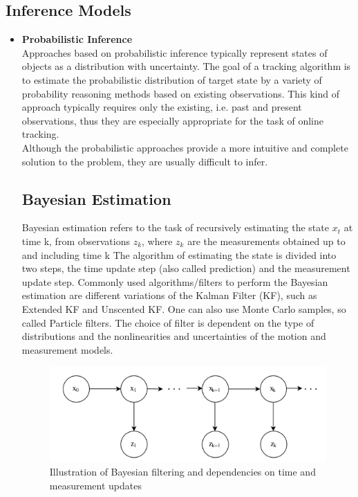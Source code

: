     \subsection{Inference Models}
        \begin{itemize}
            \item \textbf{Probabilistic Inference} \\ 
                Approaches based on probabilistic inference typically  represent states of objects as a distribution with uncertainty. The goal of a tracking algorithm is to estimate the probabilistic distribution of target state 
                by a variety of probability reasoning methods based on existing observations. This kind of approach typically requires only the existing, i.e. past and present observations, thus they are especially appropriate for 
                the task of online tracking. \\
                \vspace{3mm}
                Although the probabilistic approaches provide a more intuitive and complete solution to the problem, they are usually difficult to infer.
                \subsection{Bayesian Estimation}
                    Bayesian estimation refers to the task of recursively estimating the state \textbf{$x_t$} at time k, from observations \emph{$z_k$}, where \emph{$z_k$} are the measurements obtained up to and including time k 
                    The algorithm of estimating the state is divided into two steps, the time update step (also called prediction) and the measurement update step. Commonly used algorithms/filters to perform the Bayesian estimation 
                    are different variations of the Kalman Filter (KF), such as Extended KF and Unscented KF. One can also use Monte Carlo samples, so called Particle filters. The choice of filter is dependent on the type of distributions 
                    and the nonlinearities and uncertainties of the motion and measurement models.
                    \begin{figure}[H]
                        \centering
                        \includegraphics[width=0.6\linewidth]{img/Bayesian.png}
                        \caption{Illustration of Bayesian filtering and dependencies on time and measurement updates}
                    \end{figure}

\end{itemize}
